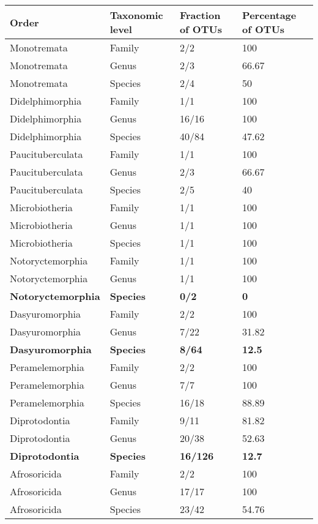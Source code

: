 \begin{longtable}{llll}
  \hline
Order & Taxonomic level & Fraction of OTUs & Percentage of OTUs \\ 
  \hline
Monotremata & Family & 2/2 & 100 \\ 
  Monotremata & Genus & 2/3 & 66.67 \\ 
  Monotremata & Species & 2/4 & 50 \\ 
  Didelphimorphia & Family & 1/1 & 100 \\ 
  Didelphimorphia & Genus & 16/16 & 100 \\ 
  Didelphimorphia & Species & 40/84 & 47.62 \\ 
  Paucituberculata & Family & 1/1 & 100 \\ 
  Paucituberculata & Genus & 2/3 & 66.67 \\ 
  Paucituberculata & Species & 2/5 & 40 \\ 
  Microbiotheria & Family & 1/1 & 100 \\ 
  Microbiotheria & Genus & 1/1 & 100 \\ 
  Microbiotheria & Species & 1/1 & 100 \\ 
  Notoryctemorphia & Family & 1/1 & 100 \\ 
  Notoryctemorphia & Genus & 1/1 & 100 \\ 
  \textbf{Notoryctemorphia} & \textbf{Species} & \textbf{0/2} & \textbf{0} \\ 
  Dasyuromorphia & Family & 2/2 & 100 \\ 
  Dasyuromorphia & Genus & 7/22 & 31.82 \\ 
  \textbf{Dasyuromorphia} & \textbf{Species} & \textbf{8/64} & \textbf{12.5} \\ 
  Peramelemorphia & Family & 2/2 & 100 \\ 
  Peramelemorphia & Genus & 7/7 & 100 \\ 
  Peramelemorphia & Species & 16/18 & 88.89 \\ 
  Diprotodontia & Family & 9/11 & 81.82 \\ 
  Diprotodontia & Genus & 20/38 & 52.63 \\ 
  \textbf{Diprotodontia} & \textbf{Species} & \textbf{16/126} & \textbf{12.7} \\ 
  Afrosoricida & Family & 2/2 & 100 \\ 
  Afrosoricida & Genus & 17/17 & 100 \\ 
  Afrosoricida & Species & 23/42 & 54.76 \\ 

\end{longtable}
